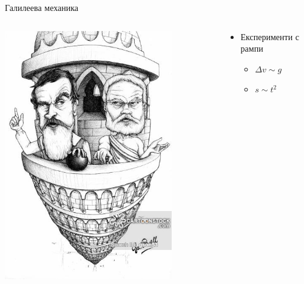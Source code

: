 \documentclass[10pt,a4paper]{beamer}
\begin{document}
        \begin{frame}{ Галилеева механика }
            \begin{columns}
                \begin{column}{0.5\textwidth}
                    \includegraphics[width=0.8\textwidth]{images/galilei_aristotle_piza.jpg}
                \end{column}
                \begin{column}{0.5\textwidth}
                    \begin{itemize}
                        \item Експерименти с рампи \begin{itemize}
                            \item $ \Delta v \sim g $
                            \item $ s \sim t^2 $
                        \end{itemize}
                    \end{itemize}
                \end{column}
            \end{columns}
        \end{frame}
    
\end{document}
